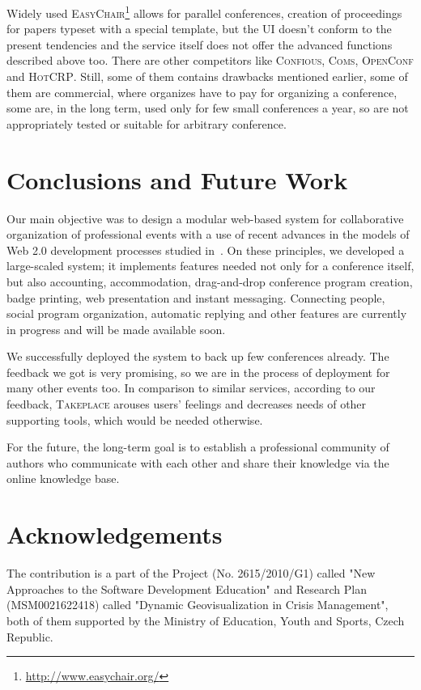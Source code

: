 \documentclass[conference]{IEEEtran}
\newcommand\tp{\textsc{Takeplace}\xspace}
\begin{document}
Widely used \textsc{EasyChair}\footnote{\url{http://www.easychair.org/}}
allows for parallel conferences, creation of proceedings for papers typeset
with a special template, but the UI doesn't conform to the present tendencies
\cite{hinca} and the service itself does not offer the advanced functions
described above too. There are other competitors like \textsc{Confious},
\textsc{Coms}, \textsc{OpenConf} and \textsc{HotCRP}. Still, some of them
contains drawbacks mentioned earlier, some of them are commercial, where
organizes have to pay for organizing a conference, some are, in the long term,
used only for few small conferences a year, so are not appropriately tested or
suitable for arbitrary conference.

\section{Conclusions and Future Work}
Our main objective was to design a modular web-based system for
collaborative organization of professional events with a use of recent
advances in the models of Web 2.0 development processes studied
in~\cite{user-centered2010}. On these principles, we developed a large-scaled
system; it implements features needed not only for a conference itself, but
also accounting, accommodation, drag-and-drop conference program creation,
badge printing, web presentation and instant messaging. Connecting people,
social program organization, automatic replying and other features are
currently in progress and will be made available soon.

We successfully deployed the system to back up few conferences already. The
feedback we got is very promising, so we are in the process of deployment for
many other events too. In comparison to similar services, according to our
feedback, \tp arouses users' feelings and decreases needs of other supporting
tools, which would be needed otherwise.

For the future, the long-term goal is to establish a professional community of
authors who communicate with each other and share their knowledge via the
online knowledge base.

\section*{Acknowledgements}
The contribution is a part of the Project (No. 2615/2010/G1) called "New
Approaches to the Software Development Education" and Research Plan
(MSM0021622418) called "Dynamic Geovisualization in Crisis Management", both
of them supported by the Ministry of Education, Youth and Sports, Czech
Republic.

 

\end{document}
